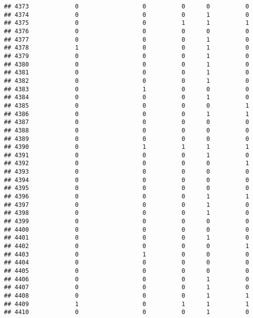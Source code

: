 \documentclass[
]{article}
\begin{document}
\begin{verbatim}
## 4373             0                  0          0      0          0
## 4374             0                  0          0      1          0
## 4375             0                  0          1      1          1
## 4376             0                  0          0      0          0
## 4377             0                  0          0      1          0
## 4378             1                  0          0      1          0
## 4379             0                  0          0      1          0
## 4380             0                  0          0      1          0
## 4381             0                  0          0      1          0
## 4382             0                  0          0      1          0
## 4383             0                  1          0      0          0
## 4384             0                  0          0      1          0
## 4385             0                  0          0      0          1
## 4386             0                  0          0      1          1
## 4387             0                  0          0      0          0
## 4388             0                  0          0      0          0
## 4389             0                  0          0      0          0
## 4390             0                  1          1      1          1
## 4391             0                  0          0      1          0
## 4392             0                  0          0      0          1
## 4393             0                  0          0      0          0
## 4394             0                  0          0      0          0
## 4395             0                  0          0      0          0
## 4396             0                  0          0      1          1
## 4397             0                  0          0      1          0
## 4398             0                  0          0      1          0
## 4399             0                  0          0      0          0
## 4400             0                  0          0      0          0
## 4401             0                  0          0      1          0
## 4402             0                  0          0      0          1
## 4403             0                  1          0      0          0
## 4404             0                  0          0      0          0
## 4405             0                  0          0      0          0
## 4406             0                  0          0      1          0
## 4407             0                  0          0      1          0
## 4408             0                  0          0      1          1
## 4409             1                  0          1      1          1
## 4410             0                  0          0      1          0

\end{verbatim}
\end{document}
